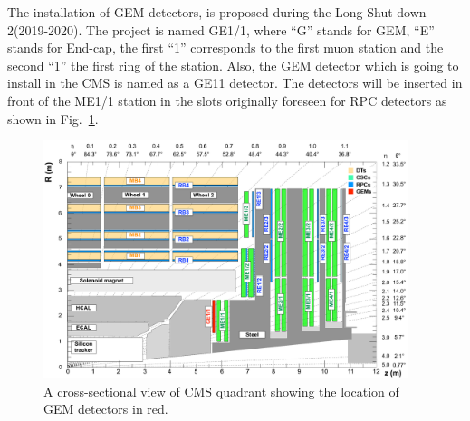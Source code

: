 The installation of GEM detectors, is proposed during the Long Shut-down 2(2019-2020).
The project is named GE1/1, where ``G'' stands for GEM, ``E'' stands for End-cap, the first ``1'' corresponds to the first muon station and the second ``1'' the first ring of the station.
Also, the GEM detector which is going to install in the CMS is named as a GE11 detector.
The detectors will be inserted in front of the ME1/1 station in the slots originally foreseen for RPC detectors as shown in Fig.~\ref{fig:GE11pos}. 
\begin{figure}[!htbp]
    \centering
    \includegraphics[width=0.95\textwidth]{figures/GEM/cms_upg_o_g_b_ni_ge1_r_140227.pdf}
    \caption{A cross-sectional view of CMS quadrant showing the location of GEM detectors in red.}
    \label{fig:GE11pos}
\end{figure}
